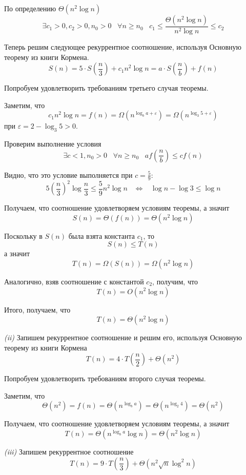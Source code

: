 \documentclass[10pt]{article}
\let \eps \varepsilon
\begin{document}
По определению $\Theta(n^2 \log{n})$
$$
  \exists c_1 > 0, c_2 > 0, n_0 > 0 \;\;\; \forall n \geq n_0 \;\;\; c_1 \leq \frac{\Theta(n^2 \log{n})}{n^2 \log{n}} \leq c_2
$$

Теперь решим следующее рекуррентное соотношение, используя Основную теорему из книги Кормена.
$$
  S(n) = 5 \cdot S\left(\frac{n}{3}\right) + c_1 n^2 \log{n} = a \cdot S\left(\frac{n}{b}\right) + f(n)
$$

Попробуем удовлетворить требованиям третьего случая теоремы.

Заметим, что
$$
  c_1 n^2 \log{n} = f(n) = \Omega(n^{\log_b{a} + \eps}) = \Omega(n^{\log_3{5} + \eps})
$$
при $\eps = 2 - \log_3{5} > 0$.

Проверим выполнение условия
$$
  \exists c < 1, n_0 > 0 \;\;\; \forall n \geq n_0 \;\;\; a f\left(\frac{n}{b}\right) \leq c f(n)
$$

Видно, что это условие выполняется при $c = \frac{5}{9}$:
$$
  5 \left(\frac{n}{3}\right)^2 \log{\frac{n}{3}} \leq \frac{5}{9} n^2 \log{n} \;\;\; \Leftrightarrow \;\;\;
  \log{n} - \log{3} \leq \log{n}
$$

Получаем, что соотношение удовлетворяем условиям теоремы, а значит
$$
  S(n) = \Theta(f(n)) = \Theta(n^2 \log{n})
$$

Поскольку в $S(n)$ была взята константа $c_1$, то
$$
  S(n) \leq T(n)
$$
а значит
$$
  T(n) = \Omega(S(n)) = \Omega(n^2 \log{n})
$$

Аналогично, взяв соотношение с константой $c_2$, получим, что
$$
  T(n) = O(n^2 \log{n})
$$

Итого, получаем, что
$$
  T(n) = \Theta(n^2 \log{n})
$$

\smallskip

{\it (ii)}
Запишем рекуррентное соотношение и решим его, используя Основную теорему из книги Кормена
$$
  T(n) = 4 \cdot T\left(\frac{n}{2}\right) + \Theta(n^2)
$$

Попробуем удовлетворить требованиям второго случая теоремы.

Заметим, что
$$
  \Theta(n^2) = f(n) = \Theta(n^{\log_b{a}}) = \Theta(n^{\log_2{4}}) = \Theta(n^2)
$$

Получаем, что соотношение удовлетворяем условиям теоремы, а значит
$$
  T(n) = \Theta(n^{\log_b{a}} \log{n}) = \Theta(n^2 \log{n})
$$

\smallskip

{\it (iii)}
Запишем рекуррентное соотношение
$$
  T(n) = 9 \cdot T\left(\frac{n}{3}\right) + \Theta(n^2 \sqrt{n} \log^2{n})
$$
\end{document}

